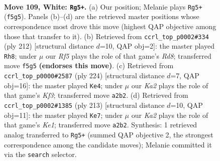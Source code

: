 \documentclass[11pt]{article}
\begin{document}
\clearpage

\begin{figure}[p]\centering
\begin{subfigure}{0.46\textwidth}\centering
\resizebox{\linewidth}{!}{%
\newchessgame
\chessboard[
  setfen={1B4k1/8/8/5R1P/8/4rp2/K7/8 w - - 10 109},
  showmover=false,
  pgfstyle=straightmove, color=movearrow, markmove={f5-g5}
]}
\caption{}
\end{subfigure}\hfill
\begin{subfigure}{0.46\textwidth}\centering
\resizebox{\linewidth}{!}{%
\newchessgame
\chessboard[
  setfen={3R4/8/8/8/2pPk3/2r5/5K2/8 w - - 4 107},
  showmover=false,
  pgfstyle=straightmove, color=movearrow, markmove={d8-h8}
]}
\caption{}
\end{subfigure}
\\[4pt]
\begin{subfigure}{0.46\textwidth}\centering
\resizebox{\linewidth}{!}{%
\newchessgame
\chessboard[
  setfen={8/6k1/3PR2p/7r/8/5K2/8/8 w - - 1 113},
  showmover=false,
  pgfstyle=straightmove, color=movearrow, markmove={f3-e4}
]}
\caption{}
\end{subfigure}\hfill
\begin{subfigure}{0.46\textwidth}\centering
\resizebox{\linewidth}{!}{%
\newchessgame
\chessboard[
  setfen={4k3/5p2/1P6/2K5/8/3R4/1r6/8 b - - 2 107},
  showmover=false,
  pgfstyle=straightmove, color=movearrow, markmove={e8-e7}
]}
\caption{}
\end{subfigure}
\caption{\textbf{Move 109, White: \texttt{Rg5+}.} (a) Our position; Melanie plays \texttt{Rg5+} (\texttt{f5g5}). Panels (b)--(d) are the retrieved master positions whose correspondence most drove this move (highest QAP objective among those that transfer to it). (b) Retrieved from \texttt{ccrl\_top\_p0002\#334} (ply 212) [structural distance $d$=10, QAP obj=2]: the master played \texttt{Rh8}; under $\mu$ our \emph{Rf5} plays the role of that game's \emph{Rd8}; transferred move \texttt{f5g5} \textbf{(endorses this move)}. (c) Retrieved from \texttt{ccrl\_top\_p0000\#2587} (ply 224) [structural distance $d$=7, QAP obj=16]: the master played \texttt{Ke4}; under $\mu$ our \emph{Ka2} plays the role of that game's \emph{Kf3}; transferred move \texttt{a2b2}. (d) Retrieved from \texttt{ccrl\_top\_p0002\#1385} (ply 213) [structural distance $d$=10, QAP obj=11]: the master played \texttt{Ke7}; under $\mu$ our \emph{Ka2} plays the role of that game's \emph{Ke1}; transferred move \texttt{a2b2}. Synthesis: 1 retrieved analog transferred to \texttt{Rg5+} (summed QAP objective 2, the strongest correspondence among the candidate moves); Melanie committed it via the \texttt{search} selector.}
\label{fig:thought-m216}
\end{figure}
\end{document}
